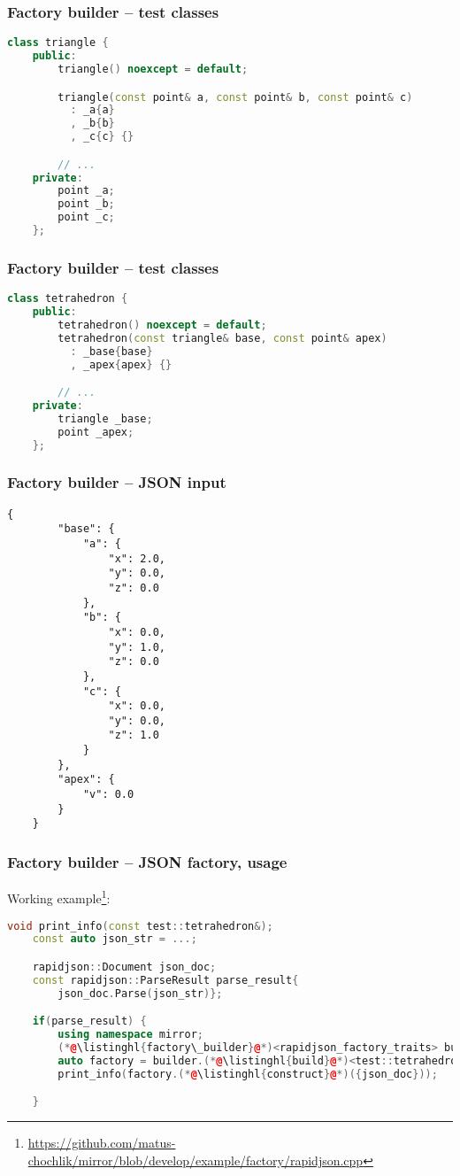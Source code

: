 \documentclass[compress,table,xcolor=table]{beamer}
\begin{document}
\begin{frame}[fragile]
\frametitle{Factory builder -- test classes}
    \begin{lstlisting}[language=c++]
    class triangle {
    public:
        triangle() noexcept = default;

        triangle(const point& a, const point& b, const point& c)
          : _a{a}
          , _b{b}
          , _c{c} {}

        // ...
    private:
        point _a;
        point _b;
        point _c;
    };
    \end{lstlisting}
\end{frame}
\begin{frame}[fragile]
\frametitle{Factory builder -- test classes}
    \begin{lstlisting}[language=c++]
    class tetrahedron {
    public:
        tetrahedron() noexcept = default;
        tetrahedron(const triangle& base, const point& apex)
          : _base{base}
          , _apex{apex} {}

        // ...
    private:
        triangle _base;
        point _apex;
    };
    \end{lstlisting}
\end{frame}
\begin{frame}[fragile]
\frametitle{Factory builder -- JSON input}
    \begin{lstlisting}[basicstyle=\scriptsize\ttfamily]
    {
        "base": {
            "a": {
                "x": 2.0,
                "y": 0.0,
                "z": 0.0
            },
            "b": {
                "x": 0.0,
                "y": 1.0,
                "z": 0.0
            },
            "c": {
                "x": 0.0,
                "y": 0.0,
                "z": 1.0
            }
        },
        "apex": {
            "v": 0.0
        }
    }
    \end{lstlisting}
\end{frame}
\begin{frame}[fragile]
\frametitle{Factory builder -- JSON factory, usage}
    \large
    Working example\footnote{
        \url{https://github.com/matus-chochlik/mirror/blob/develop/example/factory/rapidjson.cpp}}:
    \begin{lstlisting}[language=c++]
    void print_info(const test::tetrahedron&);
    const auto json_str = ...;

    rapidjson::Document json_doc;
    const rapidjson::ParseResult parse_result{
        json_doc.Parse(json_str)};

    if(parse_result) {
        using namespace mirror;
        (*@\listinghl{factory\_builder}@*)<rapidjson_factory_traits> builder;
        auto factory = builder.(*@\listinghl{build}@*)<test::tetrahedron>();
        print_info(factory.(*@\listinghl{construct}@*)({json_doc}));

    }
    \end{lstlisting}
\end{frame}
\end{document}

